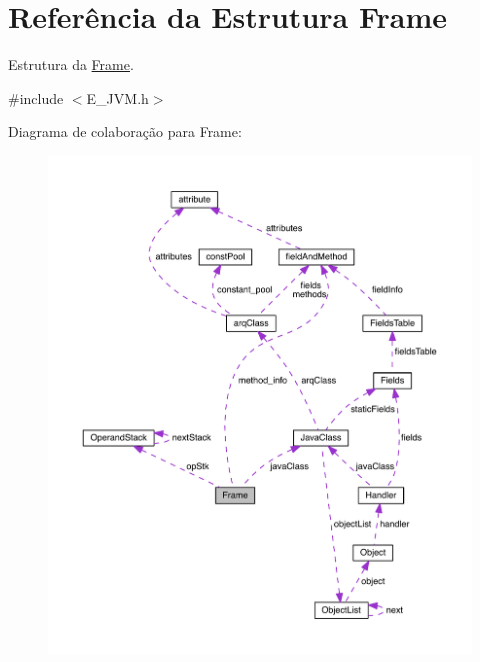 \hypertarget{struct_frame}{}\section{Referência da Estrutura Frame}
\label{struct_frame}


Estrutura da \hyperlink{struct_frame}{Frame}.  




{\ttfamily \#include $<$E\+\_\+\+J\+V\+M.\+h$>$}



Diagrama de colaboração para Frame\+:
\nopagebreak
\begin{figure}[H]
\begin{center}
\leavevmode
\includegraphics[width=350pt]{struct_frame__coll__graph}
\end{center}
\end{figure}
